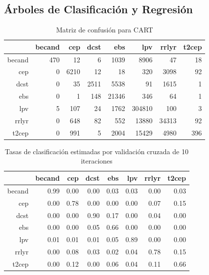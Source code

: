 \documentclass[letterpaper,12pt]{book}
\begin{document}
\subsection{Árboles de Clasificación y Regresión}
\begin{table}[ht]
  \centering
  \caption{Matriz de confusión para CART} 
  \label{cuadro:cmCart}
  \begin{tabular}{rrrrrrrr}
    \hline
    & becand & cep & dcst & ebs & lpv & rrlyr & t2cep \\ 
    \hline
    becand & 470 &  12 &   6 & 1039 & 8906 &  47 &  18 \\ 
    cep &   0 & 6210 &  12 &  18 & 320 & 3098 &  92 \\ 
    dcst &   0 &  35 & 2511 & 5538 &  91 & 1615 &   1 \\ 
    ebs &   0 &   1 & 148 & 21346 & 346 &  64 &   1 \\ 
    lpv &   5 & 107 &  24 & 1762 & 304810 & 100 &   3 \\ 
    rrlyr &   0 & 648 &  82 & 552 & 13880 & 34313 &  92 \\ 
    t2cep &   0 & 991 &   5 & 2004 & 15429 & 4980 & 396 \\ 
    \hline
  \end{tabular}
\end{table}

\begin{table}[ht]
  \centering
  \caption{Tasas de clasificación estimadas por validación cruzada de 10 iteraciones} 
  \label{table:cmCvCart}
  \begin{tabular}{rrrrrrrr}
    \hline
    & becand & cep & dcst & ebs & lpv & rrlyr & t2cep \\ 
    \hline
    becand & 0.99 & 0.00 & 0.00 & 0.03 & 0.03 & 0.00 & 0.03 \\ 
    cep & 0.00 & 0.78 & 0.00 & 0.00 & 0.00 & 0.07 & 0.15 \\ 
    dcst & 0.00 & 0.00 & 0.90 & 0.17 & 0.00 & 0.04 & 0.00 \\ 
    ebs & 0.00 & 0.00 & 0.05 & 0.66 & 0.00 & 0.00 & 0.00 \\ 
    lpv & 0.01 & 0.01 & 0.01 & 0.05 & 0.89 & 0.00 & 0.00 \\ 
    rrlyr & 0.00 & 0.08 & 0.03 & 0.02 & 0.04 & 0.78 & 0.15 \\ 
    t2cep & 0.00 & 0.12 & 0.00 & 0.06 & 0.04 & 0.11 & 0.66 \\ 
    \hline
  \end{tabular}
\end{table}
\end{document}
